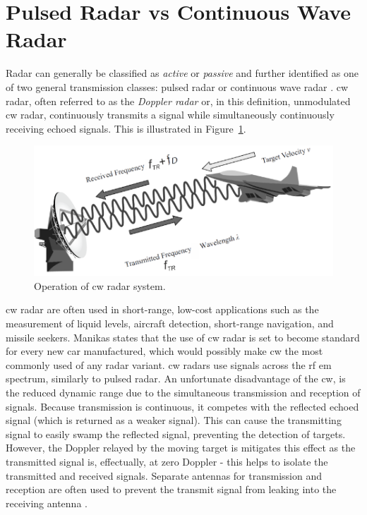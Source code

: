 \documentclass[class=report,11pt,crop=false]{standalone}
\begin{document}
\section{Pulsed Radar vs Continuous Wave Radar}
\Gls{Radar} can generally be classified as \emph{active} or  \emph{passive} and further identified as one of two general transmission classes: pulsed \gls{radar} or continuous wave \gls{radar} \cite{cwradarlecture}. \Gls{cw} \gls{radar}, often referred to as the \emph{Doppler radar} or, in this definition, unmodulated \gls{cw} \gls{radar}, continuously transmits a signal while simultaneously continuously receiving echoed signals. This is illustrated in Figure~\ref{fig:cw}.

\begin{figure}[htbp]
    \centering
    \includegraphics[width=0.6\columnwidth]{../Images/cw.png}
    \caption{Operation of \gls{cw} radar system.}
    \label{fig:cw}
\end{figure}

\gls{cw} \gls{radar} are often used in short-range, low-cost applications \cite{cwradarlecture, pomr} such as the measurement of liquid levels, aircraft detection, short-range navigation, and missile seekers. Manikas states that the use of \gls{cw} \gls{radar} is set to become standard for every new car manufactured, which would possibly make \gls{cw} the most commonly used of any radar variant. \gls{cw} radars use signals across the \gls{rf} \gls{em} spectrum, similarly to pulsed radar. An unfortunate disadvantage of the \gls{cw}, is the reduced dynamic range due to the simultaneous transmission and reception of signals. Because transmission is continuous, it competes with the reflected echoed signal (which is returned as a weaker signal). This can cause the transmitting signal to easily swamp the reflected signal, preventing the detection of targets. However, the Doppler relayed by the moving target is mitigates this effect as the transmitted signal is, effectually, at zero Doppler - this helps to isolate the transmitted and received signals. Separate antennas for transmission and reception are often used to prevent the transmit signal from leaking into the receiving antenna \cite{cwradarlecture, mitlecture}.
\end{document}
